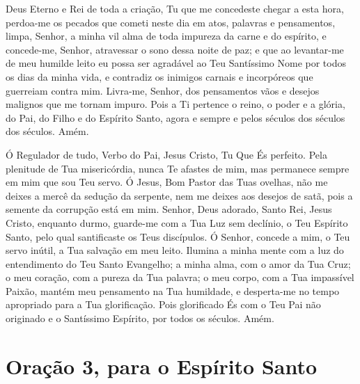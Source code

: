 \documentclass{subfiles}
\begin{document}
Deus Eterno e Rei de toda a criação, Tu que me concedeste chegar a 
esta hora, perdoa-me os pecados que cometi neste dia em atos, palavras e 
pensamentos, limpa, Senhor, a minha vil alma de toda impureza da carne e do 
espírito, e concede-me, Senhor, atravessar o sono dessa noite de paz; e que ao 
levantar-me de meu humilde leito eu possa ser agradável ao Teu Santíssimo 
Nome por todos os dias da minha vida, e contradiz os inimigos carnais e 
incorpóreos que guerreiam contra mim. Livra-me, Senhor, dos pensamentos 
vãos e desejos malignos que me tornam impuro. Pois a Ti pertence o reino, o 
poder e a glória, do Pai, do Filho e do Espírito Santo, agora e sempre e pelos 
séculos dos séculos dos séculos. Amém. 


Ó Regulador de tudo, Verbo do Pai, Jesus Cristo, Tu Que És perfeito. 
Pela plenitude de Tua misericórdia, nunca Te afastes de mim, mas permanece 
sempre em mim que sou Teu servo. Ó Jesus, Bom Pastor das Tuas ovelhas, não 
me deixes a mercê da sedução da serpente, nem me deixes aos desejos de 
satã, pois a semente da corrupção está em mim. Senhor, Deus adorado, Santo 
Rei, Jesus Cristo, enquanto durmo, guarde-me com a Tua Luz sem declínio, o 
Teu Espírito Santo, pelo qual santificaste os Teus discípulos. Ó Senhor, concede 
a mim, o Teu servo inútil, a Tua salvação em meu leito. Ilumina a minha mente 
com a luz do entendimento do Teu Santo Evangelho; a minha alma, com o 
amor da Tua Cruz; o meu coração, com a pureza da Tua palavra; o meu corpo, 
com a Tua impassível Paixão, mantém meu pensamento na Tua humildade, e 
desperta-me no tempo apropriado para a Tua glorificação. Pois glorificado És 
com o Teu Pai não originado e o Santíssimo Espírito, por todos os séculos. Amém.

\section*{Oração 3, para o Espírito Santo} 
\end{document}
